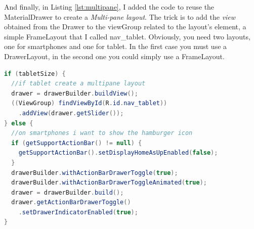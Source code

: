 And finally, in Listing \ref{lst:multipane}, I added the code to reuse the \textsf{MaterialDrawer} to create a \emph{Multi-pane layout}. The trick is to add the \emph{view} obtained from the \textsf{Drawer} to the \textsf{viewGroup} related to the layout's element, a simple \textsf{FrameLayout} that I called \textsf{nav\_tablet}. Obviously, you need two layouts, one for smartphones and one for tablet. In the first case you must use a \textsf{DrawerLayout}, in the second one you could simply use a \textsf{FrameLayout}.


\begin{lstlisting}[caption={Reuse Drawer for Multi-pane layout},label=lst:multipane, language=Java]
if (tabletSize) {
  //if tablet create a multipane layout
  drawer = drawerBuilder.buildView();
  ((ViewGroup) findViewById(R.id.nav_tablet))
    .addView(drawer.getSlider());
} else {
  //on smartphones i want to show the hamburger icon
  if (getSupportActionBar() != null) {
    getSupportActionBar().setDisplayHomeAsUpEnabled(false);
  }
  drawerBuilder.withActionBarDrawerToggle(true);
  drawerBuilder.withActionBarDrawerToggleAnimated(true);
  drawer = drawerBuilder.build();
  drawer.getActionBarDrawerToggle()
    .setDrawerIndicatorEnabled(true);
}
\end{lstlisting}


